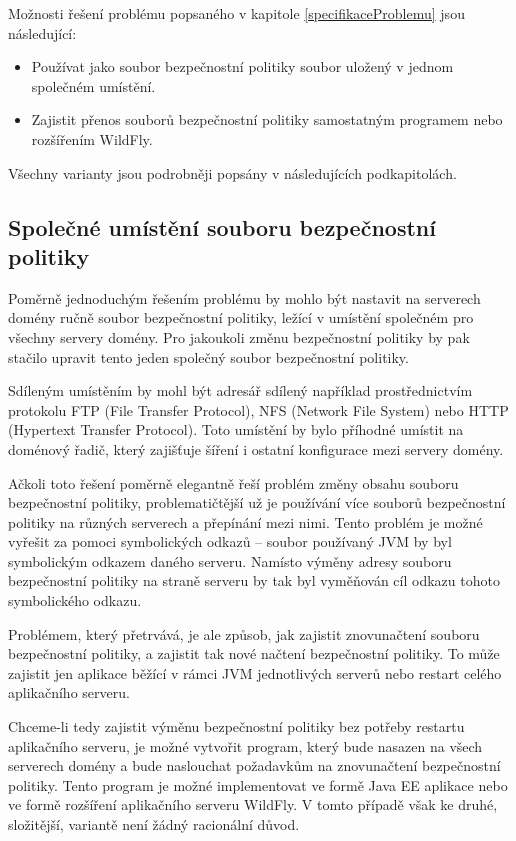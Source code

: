 Možnosti řešení problému popsaného v kapitole \ref{specifikaceProblemu} jsou následující:

\begin{itemize}
  \item Používat jako soubor bezpečnostní politiky soubor uložený v jednom společném umístění.
  \item Zajistit přenos souborů bezpečnostní politiky samostatným programem nebo rozšířením WildFly.
\end{itemize}

Všechny varianty jsou podrobněji popsány v následujících podkapitolách.

\subsection{Společné umístění souboru bezpečnostní politiky} \label{reseniSpolecne}

Poměrně jednoduchým řešením problému by mohlo být nastavit na serverech domény ručně soubor bezpečnostní politiky, ležící v umístění společném pro všechny servery domény.
Pro jakoukoli změnu bezpečnostní politiky by pak stačilo upravit tento jeden společný soubor bezpečnostní politiky.

Sdíleným umístěním by mohl být adresář sdílený například prostřednictvím protokolu FTP (File Transfer Protocol), NFS (Network File System) nebo HTTP (Hypertext Transfer Protocol).
Toto umístění by bylo příhodné umístit na doménový řadič, který zajišťuje šíření i ostatní konfigurace mezi servery domény.

Ačkoli toto řešení poměrně elegantně řeší problém změny obsahu souboru bezpečnostní politiky, problematičtější už je používání více souborů bezpečnostní politiky na různých serverech a přepínání mezi nimi.
Tento problém je možné vyřešit za pomoci symbolických odkazů -- soubor používaný JVM by byl symbolickým odkazem daného serveru.
Namísto výměny adresy souboru bezpečnostní politiky na straně serveru by tak byl vyměňován cíl odkazu tohoto symbolického odkazu.

Problémem, který přetrvává, je ale způsob, jak zajistit znovunačtení souboru bezpečnostní politiky, a zajistit tak nové načtení bezpečnostní politiky.
To může zajistit jen aplikace běžící v rámci JVM jednotlivých serverů nebo restart celého aplikačního serveru.

Chceme-li tedy zajistit výměnu bezpečnostní politiky bez potřeby restartu aplikačního serveru, je možné vytvořit program,
který bude nasazen na všech serverech domény a bude naslouchat požadavkům na znovunačtení bezpečnostní politiky.
Tento program je možné implementovat ve formě Java EE aplikace nebo ve formě rozšíření aplikačního serveru WildFly.
V tomto případě však ke druhé, složitější, variantě není žádný racionální důvod.

